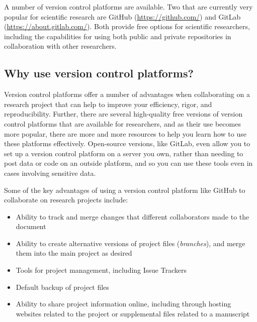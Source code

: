 \documentclass[]{tufte-book}
\providecommand{\tightlist}{%
  \setlength{\itemsep}{0pt}\setlength{\parskip}{0pt}}
\begin{document}
A number of version control platforms are available. Two that are currently very
popular for scientific research are GitHub (\url{https://github.com/}) and GitLab
(\url{https://about.gitlab.com/}). Both provide free options for scientific
researchers, including the capabilities for using both public and private
repositories in collaboration with other researchers.

\subsection{Why use version control platforms?}\label{why-use-version-control-platforms}

Version control platforms offer a number of advantages when collaborating on a
research project that can help to improve your efficiency, rigor, and
reproducibility. Further, there are several high-quality free versions of
version control platforms that are available for researchers, and as their use
becomes more popular, there are more and more resources to help you learn how to
use these platforms effectively. Open-source versions, like GitLab, even allow
you to set up a version control platform on a server you own, rather than
needing to post data or code on an outside platform, and so you can use these
tools even in cases involving sensitive data.

Some of the key advantages of using a version control platform like GitHub
to collaborate on research projects include:

\begin{itemize}
\tightlist
\item
  Ability to track and merge changes that different collaborators made to the
  document
\item
  Ability to create alternative versions of project files (\emph{branches}), and merge them into the main project as desired
\item
  Tools for project management, including Issue Trackers
\item
  Default backup of project files
\item
  Ability to share project information online, including through hosting websites related to the project or supplemental files related to a manuscript
\end{itemize}
\end{document}
